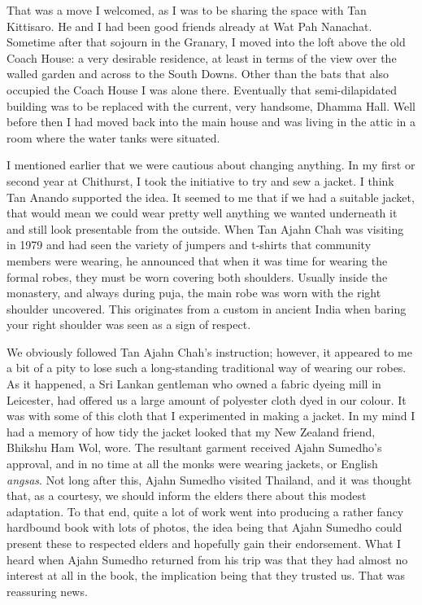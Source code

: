 That was a move I welcomed, as I was to be sharing the space with Tan
Kittisaro. He and I had been good friends already at Wat Pah Nanachat.
Sometime after that sojourn in the Granary, I moved into the loft above
the old Coach House: a very desirable residence, at least in terms of
the view over the walled garden and across to the South Downs. Other
than the bats that also occupied the Coach House I was alone there.
Eventually that semi-dilapidated building was to be replaced with the
current, very handsome, Dhamma Hall. Well before then I had moved back
into the main house and was living in the attic in a room where the
water tanks were situated.

I mentioned earlier that we were cautious about changing anything. In my
first or second year at Chithurst, I took the initiative to try and sew
a jacket. I think Tan Anando supported the idea. It seemed to me that if
we had a suitable jacket, that would mean we could wear pretty well
anything we wanted underneath it and still look presentable from the
outside. When Tan Ajahn Chah was visiting in 1979 and had seen the
variety of jumpers and t-shirts that community members were wearing, he
announced that when it was time for wearing the formal robes, they must
be worn covering both shoulders. Usually inside the monastery, and
always during puja, the main robe was worn with the right shoulder
uncovered. This originates from a custom in ancient India when baring
your right shoulder was seen as a sign of respect.

We obviously followed Tan Ajahn Chah's instruction; however, it appeared
to me a bit of a pity to lose such a long-standing traditional way of
wearing our robes. As it happened, a Sri Lankan gentleman who owned a
fabric dyeing mill in Leicester, had offered us a large amount of
polyester cloth dyed in our colour. It was with some of this cloth that
I experimented in making a jacket. In my mind I had a memory of how tidy
the jacket looked that my New Zealand friend, Bhikshu Ham Wol, wore. The
resultant garment received Ajahn Sumedho's approval, and in no time at
all the monks were wearing jackets, or English \emph{angsas}. Not long
after this, Ajahn Sumedho visited Thailand, and it was thought that, as
a courtesy, we should inform the elders there about this modest
adaptation. To that end, quite a lot of work went into producing a
rather fancy hardbound book with lots of photos, the idea being that
Ajahn Sumedho could present these to respected elders and hopefully gain
their endorsement. What I heard when Ajahn Sumedho returned from his
trip was that they had almost no interest at all in the book, the
implication being that they trusted us. That was reassuring news.

